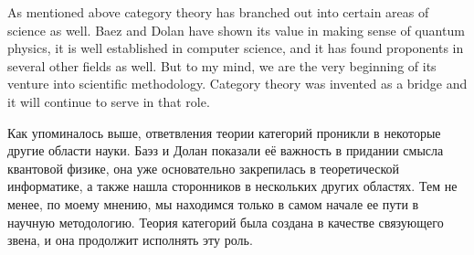 \documentclass[CT4S-EN-RU]{subfiles}
\begin{document}
\begin{blockENG}
As mentioned above category theory has branched out into certain areas of science as well. Baez and Dolan have shown its value in making sense of quantum physics, it is well established in computer science, and it has found proponents in several other fields as well. But to my mind, we are the very beginning of its venture into scientific methodology. Category theory was invented as a bridge and it will continue to serve in that role.
\end{blockENG}

\begin{blockRUS}
Как упоминалось выше, ответвления теории категорий проникли в некоторые другие области науки. Баэз и Долан показали её важность в придании смысла квантовой физике, она уже основательно закрепилась в теоретической информатике, а также нашла сторонников в нескольких других областях. Тем не менее, по моему мнению, мы находимся только в самом начале ее пути в научную методологию. Теория категорий была создана в качестве связующего звена, и она продолжит исполнять эту роль. 
\end{blockRUS}
\end{document}
